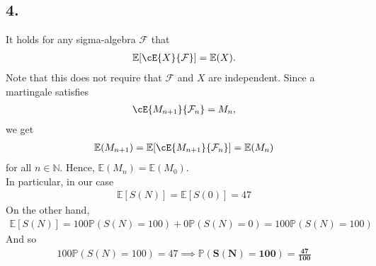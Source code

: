 \subsection*{4.}

It holds for any sigma-algebra $\mathcal{F}$ that
\begin{gather*}
    \mathbb{E}[\cE{X}{\mathcal{F}}] = \mathbb{E}(X).
\end{gather*}
Note that this does not require that $\mathcal{F}$ and $X$ are independent. Since a martingale satisfies
\begin{gather*}
    \cE{M_{n+1}}{\mathcal{F}_{n}}=M_n,
\end{gather*}
we get
\begin{gather*}
    \mathbb{E}(M_{n+1})=\mathbb{E}[\cE{M_{n+1}}{\mathcal{F}_n}]=\mathbb{E}(M_n)
\end{gather*}
for all $n \in \mathbb{N}$. Hence, $\mathbb{E}(M_n)=\mathbb{E}(M_0)$.\\
In particular, in our case
\begin{gather*}
    \mathbb{E}[S(N)]=\mathbb{E}[S(0)]=47
\end{gather*}
On the other hand,
\begin{gather*}
    \mathbb{E}[S(N)]=100\mathbb{P}(S(N)=100) + 0\mathbb{P}(S(N)=0) = 100\mathbb{P}(S(N)=100)
\end{gather*}
And so
\begin{gather*}
    100\mathbb{P}(S(N)=100) = 47 \implies \mathbf{\mathbb{P}(S(N)=100)=\frac{47}{100}}
\end{gather*}


